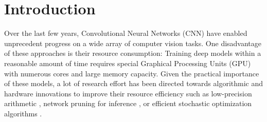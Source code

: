 \documentclass[twocolumn]{bmcart}
\begin{document}
\begin{frontmatter}
\begin{fmbox}
\begin{abstractbox}

\begin{keyword}
\end{keyword}


\end{abstractbox}
\end{fmbox}%
\end{frontmatter}




\section{Introduction}
Over the last few years, Convolutional Neural Networks (CNN) have enabled unprecedent progress on a wide array of computer vision tasks.
One disadvantage of these approaches is their resource consumption: 
Training deep models within a reasonable amount of time requires special
Graphical Processing Units (GPU) with numerous cores and large memory capacity.
Given the practical importance of these models, a lot of research effort has been directed
towards algorithmic and hardware innovations to improve their resource efficiency such as low-precision arithmetic \cite{jacob2018quantization}, network pruning for inference \cite{molchanov2016pruning}, or efficient stochastic optimization algorithms \cite{kingma2014adam}.
\end{document}
